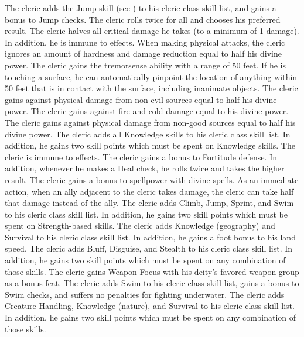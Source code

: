             The cleric adds the Jump skill (see ) to his cleric class skill list, and gains a  bonus to Jump checks.
            The cleric rolls twice for all  and chooses his preferred result.
            The cleric halves all critical damage he takes (to a minimum of 1 damage).
            In addition, he is immune to  effects.
            When making physical attacks, the cleric ignores an amount of hardness and damage reduction equal to half his divine power.
            The cleric gains the tremorsense ability with a range of 50 feet.
            If he is touching a surface, he can automatically pinpoint the location of anything within 50 feet that is in contact with the surface, including inanimate objects.
            The cleric gains  against physical damage from non-evil sources equal to half his divine power.
            The cleric gains  against fire and cold damage equal to his divine power.
            The cleric gains  against physical damage from non-good sources equal to half his divine power.
            The cleric adds all Knowledge skills to his cleric class skill list.
            In addition, he gains two skill points which must be spent on Knowledge skills.
            The cleric is immune to  effects.
            The cleric gains a  bonus to Fortitude defense.
            In addition, whenever he makes a Heal check, he rolls twice and takes the higher result.
            The cleric gains a  bonus to spellpower with divine spells.
            As an immediate action, when an ally adjacent to the cleric takes damage, the cleric can take half that damage instead of the ally.
            The cleric adds Climb, Jump, Sprint, and Swim to his cleric class skill list.
            In addition, he gains two skill points which must be spent on Strength-based skills.
            The cleric adds Knowledge (geography) and Survival to his cleric class skill list.
            In addition, he gains a  foot bonus to his land speed.
            The cleric adds Bluff, Disguise, and Stealth to his cleric class skill list.
            In addition, he gains two skill points which must be spent on any combination of those skills.
            The cleric gains Weapon Focus with his deity's favored weapon group as a bonus feat.
            The cleric adds Swim to his cleric class skill list, gains a  bonus to Swim checks, and suffers no penalties for fighting underwater.
            The cleric adds Creature Handling, Knowledge (nature), and Survival to his cleric class skill list.
            In addition, he gains two skill points which must be spent on any combination of those skills.

